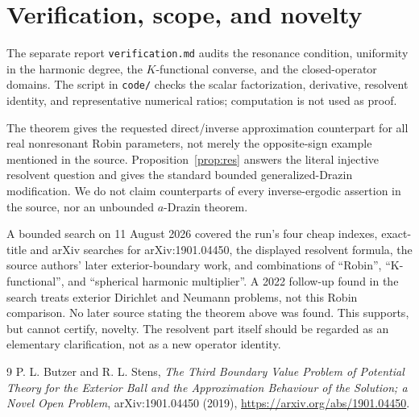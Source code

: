\documentclass[11pt]{article}
\begin{document}
\section{Verification, scope, and novelty}

The separate report \texttt{verification.md} audits the resonance condition,
uniformity in the harmonic degree, the $K$-functional converse, and the
closed-operator domains.  The script in \texttt{code/} checks the scalar
factorization, derivative, resolvent identity, and representative numerical
ratios; computation is not used as proof.

The theorem gives the requested direct/inverse approximation counterpart for
all real nonresonant Robin parameters, not merely the opposite-sign example
mentioned in the source.  Proposition~\ref{prop:res} answers the literal
injective resolvent question and gives the standard bounded
generalized-Drazin modification.  We do not claim counterparts of every
inverse-ergodic assertion in the source, nor an unbounded $a$-Drazin theorem.

A bounded search on 11 August 2026 covered the run's four cheap indexes,
exact-title and arXiv searches for arXiv:1901.04450, the displayed resolvent
formula, the source authors' later exterior-boundary work, and combinations
of ``Robin'', ``K-functional'', and ``spherical harmonic multiplier''.  A
2022 follow-up found in the search treats exterior Dirichlet and Neumann
problems, not this Robin comparison.  No later source stating the theorem
above was found.  This supports, but cannot certify, novelty.  The resolvent
part itself should be regarded as an elementary clarification, not as a new
operator identity.

\begin{thebibliography}{9}
P. L. Butzer and R. L. Stens,
\emph{The Third Boundary Value Problem of Potential Theory for the Exterior
Ball and the Approximation Behaviour of the Solution; a Novel Open Problem},
arXiv:1901.04450 (2019),
\url{https://arxiv.org/abs/1901.04450}.
\end{thebibliography}
\end{document}
